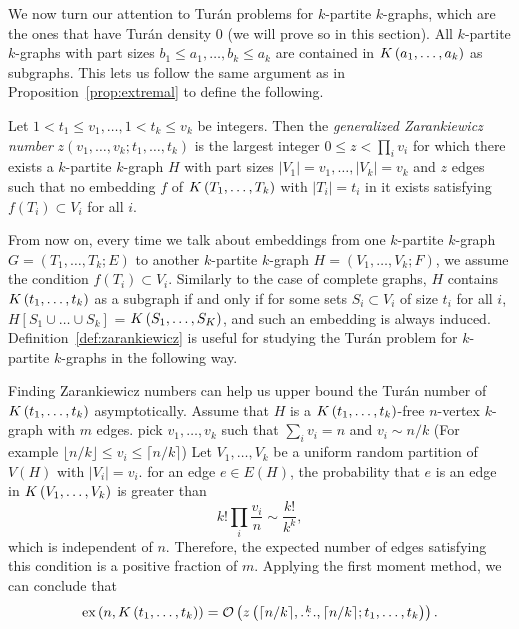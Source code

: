 We now turn our attention to Turán problems for $k$-partite $k$-graphs,
which are the ones that have Turán density $0$ (we will prove so in this section).
All $k$-partite $k$-graphs with part sizes $b_1 \leq a_1, \dots, b_k \leq a_k$
are contained in $K\left(a_1, \dots, a_k\right)$ as subgraphs.
This lets us follow the same argument as in Proposition~\ref{prop:extremal}
to define the following.

\begin{definition}\label{def:zarankiewicz}
    Let $1 < t_1 \leq v_1, \dots, 1 < t_k \leq v_k$ be integers.
    Then the \emph{generalized Zarankiewicz number} $z(v_1, \dots, v_k; t_1, \dots, t_k)$
    is the largest integer $0 \leq z < \prod_i{ v_i}$ for which there exists a $k$-partite $k$-graph
    $H$ with part sizes $ |V_1| = v_1, \dots, |V_k| = v_k$ and $z$ edges
    such that no embedding $f$ of $K\left(T_1, \dots, T_k\right)$ with $|T_i| = t_i$ in it exists
    satisfying $f(T_i) \subset V_i$ for all $i$.
\end{definition}

From now on, every time we talk about embeddings from one $k$-partite $k$-graph
$G = (T_1, \dots, T_k; E)$ to another $k$-partite $k$-graph $H = (V_1, \dots, V_k; F)$,
we assume the condition $f(T_i) \subset V_i$.
Similarly to the case of complete graphs,
$H$ contains $K\left(t_1, \dots, t_k\right)$ as a subgraph if and only if
for some sets $S_i \subset V_i$ of size $t_i$ for all $i$,
$H[S_1 \cup \dots \cup S_k]$ = $K\left(S_1, \dots, S_K\right)$,
and such an embedding is always induced.
Definition~\ref{def:zarankiewicz} is useful for studying the Turán problem for $k$-partite $k$-graphs
in the following way.

\begin{remark}\label{rem:zar_vs_turan}
    Finding Zarankiewicz numbers can help us upper bound the Turán number of $K\left(t_1, \dots, t_k\right)$ asymptotically.
    Assume that $H$ is a $K\left(t_1, \dots, t_k\right)$-free $n$-vertex $k$-graph with $m$ edges.
    pick $v_1, \dots, v_k$ such that $\sum_{i} v_i = n $ and $v_i \sim n/k $
    (For example $\lfloor n/k \rfloor \leq v_i \leq \lceil n/k \rceil$)
    Let $V_1, \dots, V_k$ be a uniform random partition of $V(H)$ with $|V_i| = v_i$.
    for an edge $e \in E(H)$, the probability that $e$ is an edge in $K\left(V_1, \dots, V_k\right)$ is
    greater than
    \[k! \prod_i \frac{v_i}{n} \sim \frac{k!}{k^k},\]
    which is independent of $n$.
    Therefore, the expected number of edges satisfying this condition is a positive fraction of $m$.
    Applying the first moment method, we can conclude that
    \[
        \text{ex} \left( n, K\left(t_1, \dots, t_k\right) \right) = \mathcal{O}\left(z\left(\lceil n / k \rceil, \overset{k}{\dots}, \lceil n / k \rceil; t_1, \dots, t_k\right)\right).
    \]

\end{remark}

